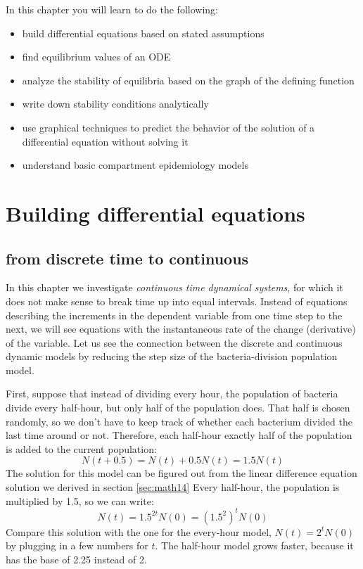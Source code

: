 \documentclass[
  letterpaper,
  DIV=11,
  numbers=noendperiod]{scrreprt}
\begin{document}
In this chapter you will learn to do the following:

\begin{itemize}
\item
  build differential equations based on stated assumptions
\item
  find equilibrium values of an ODE
\item
  analyze the stability of equilibria based on the graph of the defining
  function
\item
  write down stability conditions analytically
\item
  use graphical techniques to predict the behavior of the solution of a
  differential equation without solving it
\item
  understand basic compartment epidemiology models
\end{itemize}

\hypertarget{building-differential-equations}{%
\section{Building differential
equations}\label{building-differential-equations}}

\label{sec:model15}

\hypertarget{from-discrete-time-to-continuous}{%
\subsection{from discrete time to
continuous}\label{from-discrete-time-to-continuous}}

In this chapter we investigate 
\emph{continuous time dynamical systems}, for which it does not make
sense to break time up into equal intervals. Instead of equations
describing the increments in the dependent variable from one time step
to the next, we will see equations with the instantaneous rate of the
change (derivative) of the variable. Let us see the connection between
the discrete and continuous dynamic models by reducing the step size of
the bacteria-division population model.

First, suppose that instead of dividing every hour,
the population of
bacteria divide every half-hour, but only half of the population does.
That half is chosen randomly, so we don't have to keep track of whether
each bacterium divided the last time around or not. Therefore, each
half-hour exactly half of the population is added to the current
population: \[ N(t+0.5) = N(t) + 0.5N(t) = 1.5N(t)\] The solution for
this model can be figured out from the linear difference equation
solution we derived in section \ref{sec:math14} Every half-hour, the
population is multiplied by 1.5, so we can write:
\[ N(t) = 1.5^{2t} N(0) = (1.5^2)^t N(0)\] Compare this solution with
the one for the every-hour model, \(N(t) = 2^t N(0)\) by plugging in a
few numbers for \(t\). The half-hour model grows faster, because it has
the base of 2.25 instead of 2.
\end{document}
